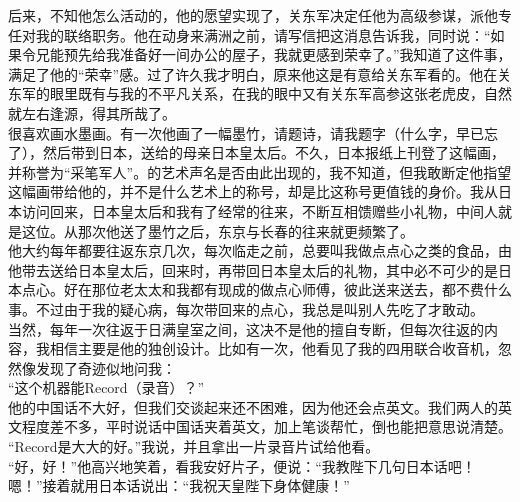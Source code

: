 后来，不知他怎么活动的，他的愿望实现了，关东军决定任他为高级参谋，派他专任对我的联络职务。他在动身来满洲之前，请写信把这消息告诉我，同时说：“如果令兄能预先给我准备好一间办公的屋子，我就更感到荣幸了。”我知道了这件事，满足了他的“荣幸”感。过了许久我才明白，原来他这是有意给关东军看的。他在关东军的眼里既有与我的不平凡关系，在我的眼中又有关东军高参这张老虎皮，自然就左右逢源，得其所哉了。\\

很喜欢画水墨画。有一次他画了一幅墨竹，请题诗，请我题字（什么字，早已忘了），然后带到日本，送给的母亲日本皇太后。不久，日本报纸上刊登了这幅画，并称誉为“采笔军人”。的艺术声名是否由此出现的，我不知道，但我敢断定他指望这幅画带给他的，并不是什么艺术上的称号，却是比这称号更值钱的身价。我从日本访问回来，日本皇太后和我有了经常的往来，不断互相馈赠些小礼物，中间人就是这位。从那次他送了墨竹之后，东京与长春的往来就更频繁了。\\

他大约每年都要往返东京几次，每次临走之前，总要叫我做点点心之类的食品，由他带去送给日本皇太后，回来时，再带回日本皇太后的礼物，其中必不可少的是日本点心。好在那位老太太和我都有现成的做点心师傅，彼此送来送去，都不费什么事。不过由于我的疑心病，每次带回来的点心，我总是叫别人先吃了才敢动。\\

当然，每年一次往返于日满皇室之间，这决不是他的擅自专断，但每次往返的内容，我相信主要是他的独创设计。比如有一次，他看见了我的四用联合收音机，忽然像发现了奇迹似地问我：\\

“这个机器能Record（录音）？”\\

他的中国话不大好，但我们交谈起来还不困难，因为他还会点英文。我们两人的英文程度差不多，平时说话中国话夹着英文，加上笔谈帮忙，倒也能把意思说清楚。\\

“Record是大大的好。”我说，并且拿出一片录音片试给他看。\\

“好，好！”他高兴地笑着，看我安好片子，便说：“我教陛下几句日本话吧！嗯！”接着就用日本话说出：“我祝天皇陛下身体健康！”\\


